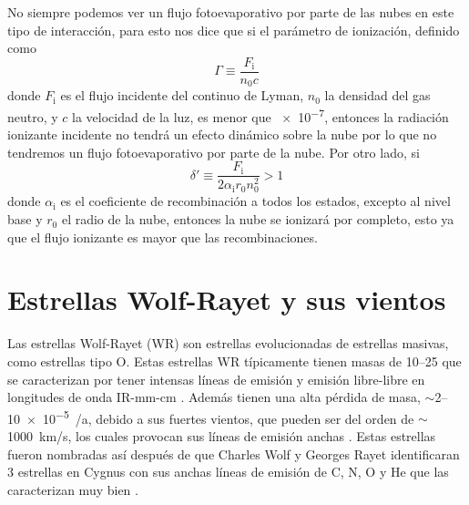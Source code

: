 \documentclass{book}
\begin{document}
No siempre podemos ver un flujo fotoevaporativo por parte de las nubes en este tipo de interacción, para esto \cite{Bertoldi_1989} nos dice que si el parámetro de ionización, definido como 
\begin{equation}
    \Gamma  \equiv \frac{F_\mathrm{i}}{n_0 c}
\end{equation}
donde $F_\mathrm{i}$ es el flujo incidente del continuo de Lyman, $n_0$ la densidad del gas neutro, y $c$ la velocidad de la luz, es menor que \SI{e-7}{}, entonces la radiación ionizante incidente no tendrá un efecto dinámico sobre la nube por lo que no tendremos un flujo fotoevaporativo por parte de la nube. Por otro lado, si 
\begin{equation}
    \delta'\equiv\frac{F_\mathrm{i}}{2\alpha_\mathrm{i} r_0 n_0^2}>1
\end{equation}
donde $\alpha_\mathrm{i}$ es el coeficiente de recombinación a todos los estados, excepto al nivel base y $r_0$ el radio de la nube, entonces la nube se ionizará por completo, esto ya que el flujo ionizante es mayor que las recombinaciones.


\section{Estrellas Wolf-Rayet y sus vientos}

Las estrellas Wolf-Rayet (WR) son estrellas evolucionadas de estrellas masivas, como estrellas tipo O. Estas estrellas WR típicamente tienen masas de 10--\SI{25}{\msun} que se caracterizan por tener intensas líneas de emisión y emisión libre-libre en longitudes de onda IR-mm-cm \citep{crowther:2007}. Además tienen una alta pérdida de masa,  $\sim$2--\SI{10e-5}{\msun/a}, debido a sus fuertes vientos, que pueden ser del orden de $\sim$\SI{1000}{km/s}, los cuales provocan sus líneas de emisión anchas \citep{Hamman:2006}. Estas estrellas fueron nombradas así después de que Charles Wolf y Georges Rayet identificaran 3 estrellas en Cygnus con sus  anchas líneas de emisión de C, N, O y He que las caracterizan muy bien \citep{WR:ref}. 
\end{document}
